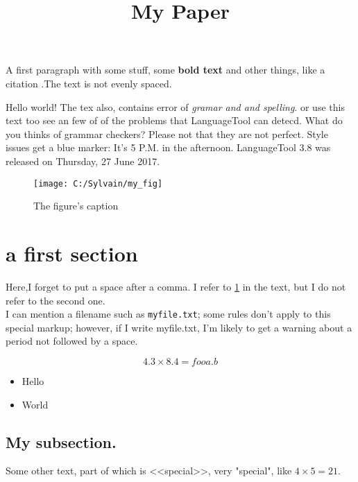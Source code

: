 \documentclass{article}
\begin{document}
\title{My Paper}
\maketitle

A first paragraph with some stuff, some \textbf{bold text}   and other things, like a citation\cite{my:paper} .The text is  not evenly spaced.

Hello world! The tex also, contains error of \emph{gramar and and spelling}. or use this text too see an few of of the problems that LanguageTool can detecd. What do you thinks of grammar checkers? Please not that they are not perfect. Style issues get a blue marker: It's 5 P.M. in the afternoon. LanguageTool 3.8 was released on Thursday, 27 June 2017.

\begin{figure}
  \texttt{[image: C:/Sylvain/my\_fig]}
  \caption{The figure's caption}
  \label{fig:thisfig1}
\end{figure}

\section{a first section}

Here,I forget to put a space after a comma. I refer to \ref{fig:thisfig1} in the text, but I do not refer to the second one. \\
I can mention a filename such as \verb+myfile.txt+; some rules don't apply to this special markup; however, if I write myfile.txt, I'm likely to get a warning about a period not followed by a space.

\begin{equation*}
4.3 \times 8.4 = foo a.b
\end{equation*}

\begin{itemize}
\item Hello %
\item   World
\end{itemize}

\subsection{ My subsection. }

Some other text, part of which is <<special>>, very "special", like $4 \times 5 = 21$.

\end{document}
